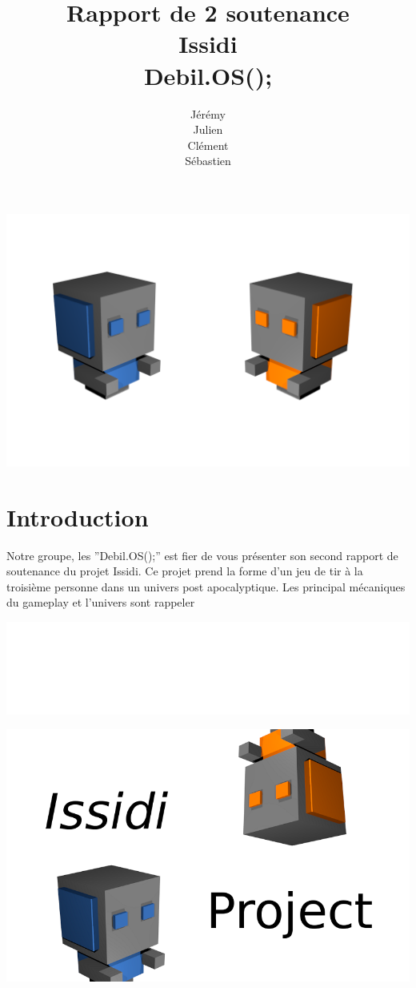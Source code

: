 ﻿\documentclass[12pt]{article}
\title{Rapport de 2\ieme{} soutenance\\
		Issidi\\
		Debil.OS();}
\author{Jérémy \bsc{Beuvry}\\
		Julien \bsc{Boulicaut}\\
		Clément \bsc{Finck}\\
		Sébastien \bsc{Fleury}}
\begin{document}
\maketitle
\centerline{\includegraphics[scale=0.4]{rf.png}}
\newpage
\tableofcontents
\newpage

\section{Introduction}
Notre groupe, les ''Debil.OS();'' est fier de vous présenter son second rapport de soutenance du projet Issidi.
\newline\newline Ce projet prend la forme d'un jeu de tir à la troisième personne dans un univers post apocalyptique.  Les principal mécaniques du gameplay et l'univers sont rappeler 

\centerline{\includegraphics[scale=0.2]{latex_sa_pue.png}}
\centerline{\includegraphics[scale=0.5]{styler.png}}
\end{document}
